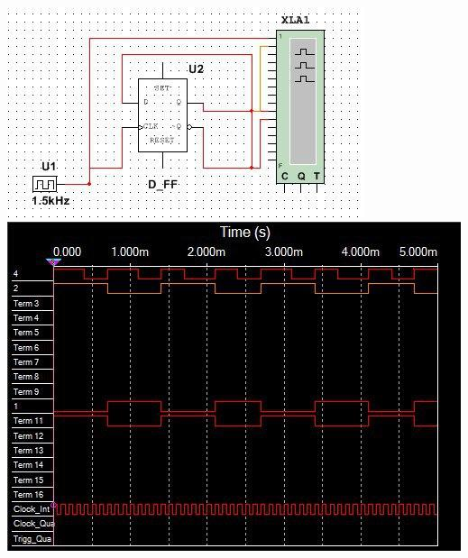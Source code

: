 \documentclass[a4paper,12pt]{article}
\begin{document}
\begin{center}
	
\includegraphics[scale=1.2]{../screens/6.jpg} \newline\newline
\includegraphics[scale=1]{../screens/6_1.jpg} \newline\newline


\end{center}
\end{document}

